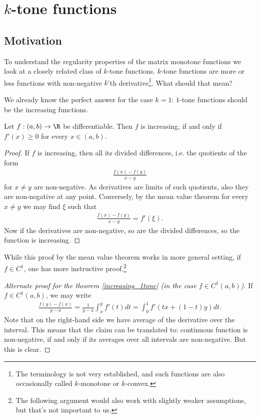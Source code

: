 \chapter{$k$-tone functions}

\section{Motivation}

To understand the regularity properties of the matrix monotone functions we look at a closely related class of $k$-tone functions. $k$-tone functions are more or less functions with non-negative $k$'th derivative\footnote{The terminology is not very established, and such functions are also occasionally called $k$-monotone or $k$-convex.}. What should that mean?

We already know the perfect answer for the case $k = 1$: $1$-tone functions should be the increasing functions.

\begin{lause}\label{increasing_1tone}
	Let $f : (a, b) \to \R$ be differentiable. Then $f$ is increasing, if and only if $f'(x) \geq 0$ for every $x \in (a, b)$.
\end{lause}

\begin{proof}
	If $f$ is increasing, then all its divided differences, i.e. the quotients of the form
	\begin{align*}
		\frac{f(x) - f(y)}{x - y}
	\end{align*}
	for $x \neq y$ are non-negative. As derivatives are limits of such quotients, also they are non-negative at any point. Conversely, by the mean value theorem for every $x \neq y$ we may find $\xi$ such that
	\begin{align*}
		\frac{f(x) - f(y)}{x - y} = f'(\xi).
	\end{align*}
	Now if the derivatives are non-negative, so are the divided differences, so the function is increasing.
\end{proof}

While this proof by the mean value theorem works in more general setting, if $f \in C^{1}$, one has more instructive proof.\footnote{The following argument would also work with slightly weaker assumptions, but that's not important to us.}

\begin{proof}[Alternate proof for the theorem \ref{increasing_1tone} (in the case $f \in C^{1}(a, b)$)]
	If $f \in C^{1}(a, b)$, we may write
	\begin{align*}
		\frac{f(y) - f(x)}{y - x} = \frac{1}{y - x}\int_{x}^{y} f'(t) dt = \int_{0}^{1} f'(t x + (1 - t) y) dt.
	\end{align*}
	Note that on the right-hand side we have average of the derivative over the interval. This means that the claim can be translated to: continuous function is non-negative, if and only if its averages over all intervals are non-negative. But this is clear.
\end{proof}


